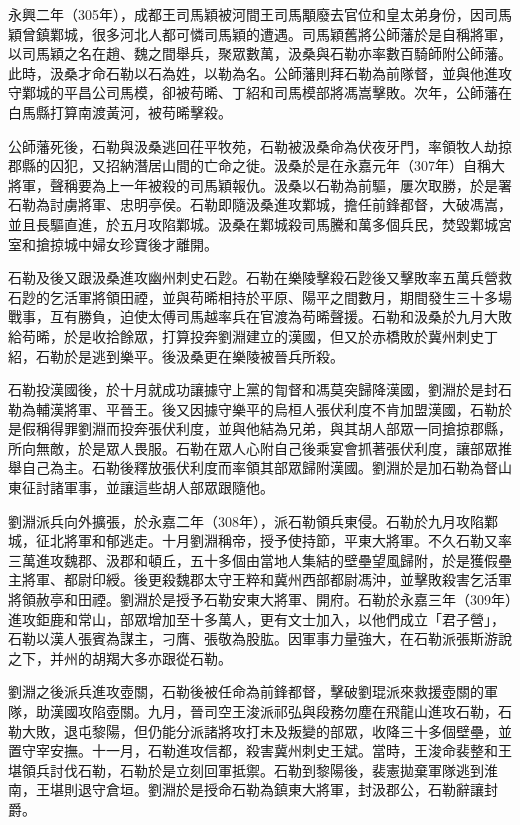 永興二年（305年），成都王司馬穎被河間王司馬顒廢去官位和皇太弟身份，因司馬穎曾鎮鄴城，很多河北人都可憐司馬穎的遭遇。司馬穎舊將公師藩於是自稱將軍，以司馬穎之名在趙、魏之間舉兵，聚眾數萬，汲桑與石勒亦率數百騎師附公師藩。此時，汲桑才命石勒以石為姓，以勒為名。公師藩則拜石勒為前隊督，並與他進攻守鄴城的平昌公司馬模，卻被苟晞、丁紹和司馬模部將馮嵩擊敗。次年，公師藩在白馬縣打算南渡黃河，被苟晞擊殺。

公師藩死後，石勒與汲桑逃回茌平牧苑，石勒被汲桑命為伏夜牙門，率領牧人劫掠郡縣的囚犯，又招納潛居山間的亡命之徙。汲桑於是在永嘉元年（307年）自稱大將軍，聲稱要為上一年被殺的司馬穎報仇。汲桑以石勒為前驅，屢次取勝，於是署石勒為討虜將軍、忠明亭侯。石勒即隨汲桑進攻鄴城，擔任前鋒都督，大破馮嵩，並且長驅直進，於五月攻陷鄴城。汲桑在鄴城殺司馬騰和萬多個兵民，焚毀鄴城宮室和搶掠城中婦女珍寶後才離開。

石勒及後又跟汲桑進攻幽州刺史石尟。石勒在樂陵擊殺石尟後又擊敗率五萬兵營救石尟的乞活軍將領田禋，並與苟晞相持於平原、陽平之間數月，期間發生三十多場戰事，互有勝負，迫使太傅司馬越率兵在官渡為苟晞聲援。石勒和汲桑於九月大敗給苟晞，於是收拾餘眾，打算投奔劉淵建立的漢國，但又於赤橋敗於冀州刺史丁紹，石勒於是逃到樂平。後汲桑更在樂陵被晉兵所殺。

石勒投漢國後，於十月就成功讓據守上黨的㔨督和馮莫突歸降漢國，劉淵於是封石勒為輔漢將軍、平晉王。後又因據守樂平的烏桓人張伏利度不肯加盟漢國，石勒於是假稱得罪劉淵而投奔張伏利度，並與他結為兄弟，與其胡人部眾一同搶掠郡縣，所向無敵，於是眾人畏服。石勒在眾人心附自己後乘宴會抓著張伏利度，讓部眾推舉自己為主。石勒後釋放張伏利度而率領其部眾歸附漢國。劉淵於是加石勒為督山東征討諸軍事，並讓這些胡人部眾跟隨他。

劉淵派兵向外擴張，於永嘉二年（308年），派石勒領兵東侵。石勒於九月攻陷鄴城，征北將軍和郁逃走。十月劉淵稱帝，授予使持節，平東大將軍。不久石勒又率三萬進攻魏郡、汲郡和頓丘，五十多個由當地人集結的壁壘望風歸附，於是獲假壘主將軍、都尉印綬。後更殺魏郡太守王粹和冀州西部都尉馮沖，並擊敗殺害乞活軍將領赦亭和田禋。劉淵於是授予石勒安東大將軍、開府。石勒於永嘉三年（309年）進攻鉅鹿和常山，部眾增加至十多萬人，更有文士加入，以他們成立「君子營」，石勒以漢人張賓為謀主，刁膺、張敬為股肱。因軍事力量強大，在石勒派張斯游說之下，并州的胡羯大多亦跟從石勒。

劉淵之後派兵進攻壺關，石勒後被任命為前鋒都督，擊破劉琨派來救援壺關的軍隊，助漢國攻陷壺關。九月，晉司空王浚派祁弘與段務勿塵在飛龍山進攻石勒，石勒大敗，退屯黎陽，但仍能分派諸將攻打未及叛變的部眾，收降三十多個壁壘，並置守宰安撫。十一月，石勒進攻信都，殺害冀州刺史王斌。當時，王浚命裴整和王堪領兵討伐石勒，石勒於是立刻回軍抵禦。石勒到黎陽後，裴憲拋棄軍隊逃到淮南，王堪則退守倉垣。劉淵於是授命石勒為鎮東大將軍，封汲郡公，石勒辭讓封爵。

